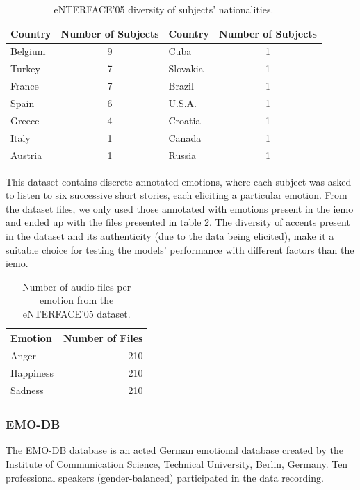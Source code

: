 \begin{table}[H]
	\centering
	\caption{eNTERFACE'05 diversity of subjects' nationalities.}
	\label{tab:enterfaceDiversity}
	\begin{tabular}{lc|lc}
		\toprule
		Country &Number of Subjects &Country &Number of Subjects\\
		\midrule
		Belgium & 9 & Cuba     & 1\\
		Turkey  & 7 & Slovakia & 1\\
		France  & 7 & Brazil   & 1\\
		Spain   & 6 & U.S.A.   & 1\\
		Greece  & 4 & Croatia  & 1\\
		Italy   & 1 & Canada   & 1\\
		Austria & 1 & Russia   & 1\\
		\bottomrule
	\end{tabular}
\end{table}

This dataset contains discrete annotated emotions, where each subject was asked to listen to six successive short stories, each eliciting a particular emotion. From the dataset files, we only used those annotated with emotions present in the \ac{iemo} and ended up with the files presented in table \ref{tab:ent_files}. The diversity of accents present in the dataset and its authenticity (due to the data being elicited), make it a suitable choice for testing the models' performance with different factors than the \ac{iemo}.

\begin{table}[H]
	\centering
	\caption{Number of audio files per emotion from the eNTERFACE'05 dataset.}
	\label{tab:ent_files}
	\begin{tabular}{lr}
		\toprule
		Emotion     &   Number of Files \\
		\midrule
		Anger      	&               210 \\
		Happiness 	&               210 \\
		Sadness    	&               210 \\
		\bottomrule
	\end{tabular}
\end{table}


\subsubsection{EMO-DB}

The EMO-DB database is an acted German emotional database created by the Institute of Communication Science, Technical University, Berlin, Germany. Ten professional speakers (gender-balanced) participated in the data recording.

